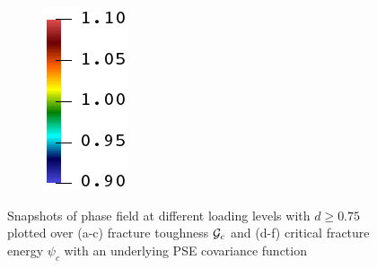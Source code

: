 \begin{figure}[!htbp]
\begin{subfigure}[b]{0.08\textwidth}
    \includegraphics[width=\textwidth]{Chapter4/figures/rainbow_vertical.png}
    \vspace{0.15in}
  \end{subfigure}
  \caption[Snapshots of phase field at different loading levels with a PSE covariance function.]{Snapshots of phase field at different loading levels with $d \geqslant 0.75$ plotted over (a-c) fracture toughness ${\mathcal{G}_c}$ and (d-f) critical fracture energy $\psi_c$ with an underlying PSE covariance function }
  \label{fig: Chapter4/2D/compare_sensitivity_sqexp}
\end{figure}

